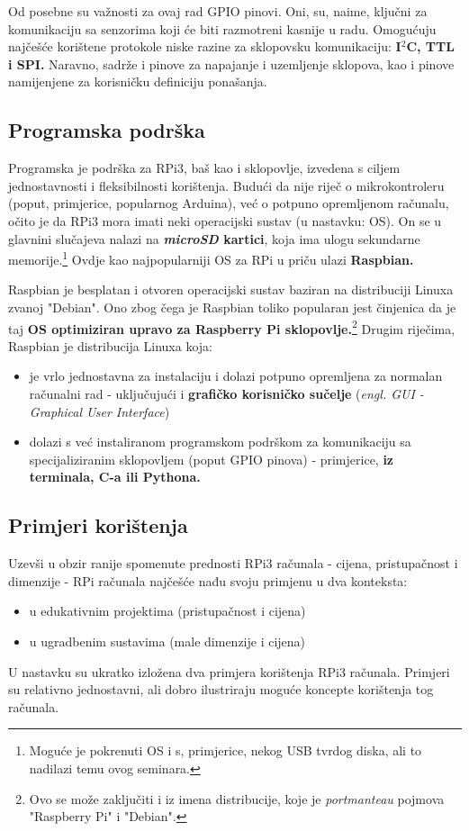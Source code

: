 \documentclass[12pt,a4paper]{article}
\begin{document}
		\par Od posebne su važnosti za ovaj rad GPIO pinovi. Oni, su, naime, ključni za komunikaciju sa senzorima koji će biti razmotreni kasnije u radu. Omogućuju najčešće korištene protokole niske razine za sklopovsku komunikaciju: \textbf{I$^2$C, TTL i SPI.} Naravno, sadrže i pinove za napajanje i uzemljenje sklopova, kao i pinove namijenjene za korisničku definiciju ponašanja.

	\subsection{Programska podrška}
		Programska je podrška za RPi3, baš kao i sklopovlje, izvedena s ciljem jednostavnosti i fleksibilnosti korištenja. Budući da nije riječ o mikrokontroleru (poput, primjerice, popularnog Arduina), već o potpuno opremljenom računalu, očito je da RPi3 mora imati neki operacijski sustav (u nastavku: OS). On se u glavnini slučajeva nalazi na \textbf{\textit{microSD} kartici}, koja ima ulogu sekundarne memorije.\footnote{Moguće je pokrenuti OS i s, primjerice, nekog USB tvrdog diska, ali to nadilazi temu ovog seminara.} Ovdje kao najpopularniji OS za RPi u priču ulazi \textbf{Raspbian.} \\

		\par Raspbian je besplatan i otvoren operacijski sustav baziran na distribuciji Linuxa zvanoj "Debian". Ono zbog čega je Raspbian toliko popularan jest činjenica da je taj \textbf{OS optimiziran upravo za Raspberry Pi sklopovlje.}\footnote{Ovo se može zaključiti i iz imena distribucije, koje je \textit{portmanteau} pojmova "Raspberry Pi" i "Debian".} Drugim riječima, Raspbian je distribucija Linuxa koja:
		\begin{itemize}
			\item je vrlo jednostavna za instalaciju i dolazi potpuno opremljena za normalan računalni rad - uključujući i \textbf{grafičko korisničko sučelje} (\textit{engl. GUI - Graphical User Interface}) 
			\item dolazi s već instaliranom programskom podrškom za komunikaciju sa specijaliziranim sklopovljem (poput GPIO pinova) - primjerice, \textbf{iz terminala, C-a ili Pythona.}
		\end{itemize}


	\subsection{Primjeri korištenja}
	Uzevši u obzir ranije spomenute prednosti RPi3 računala - cijena, pristupačnost i dimenzije - RPi računala najčešće nađu svoju primjenu u dva konteksta:
	\begin{itemize}
		\item u edukativnim projektima (pristupačnost i cijena)
		\item u ugradbenim sustavima (male dimenzije i cijena)
	\end{itemize}
	U nastavku su ukratko izložena dva primjera korištenja RPi3 računala. Primjeri su relativno jednostavni, ali dobro ilustriraju moguće koncepte korištenja tog računala.
	\\
\end{document}
